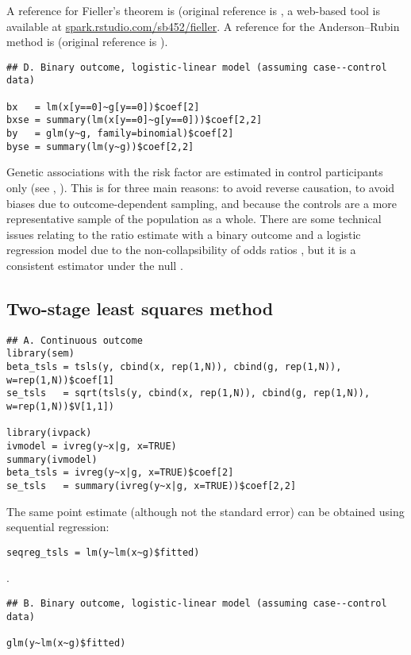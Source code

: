 \documentclass[a4paper,12pt]{article} %
\begin{document}
A reference for Fieller's theorem is \cite{buonaccorsi2005} (original reference is \cite{fieller1954}, a web-based tool is available at \url{spark.rstudio.com/sb452/fieller}. A reference for the Anderson--Rubin method is \cite{mikusheva2010} (original reference is \cite{anderson1949}).

\begin{lstlisting}
## D. Binary outcome, logistic-linear model (assuming case--control data)

bx   = lm(x[y==0]~g[y==0])$coef[2]
bxse = summary(lm(x[y==0]~g[y==0]))$coef[2,2]
by   = glm(y~g, family=binomial)$coef[2]
byse = summary(lm(y~g))$coef[2,2]
\end{lstlisting}

Genetic associations with the risk factor are estimated in control participants only (see \cite{didelez2007}, \cite{bowden2011}). This is for three main reasons: to avoid reverse causation, to avoid biases due to outcome-dependent sampling, and because the controls are a more representative sample of the population as a whole. There are some technical issues relating to the ratio estimate with a binary outcome and a logistic regression model due to the non-collapsibility of odds ratios \cite{greenland1999}, but it is a consistent estimator under the null \cite{burgess2012noncollapse, vansteelandt2010}.

\clearpage

\subsection{Two-stage least squares method}
\begin{lstlisting}
## A. Continuous outcome
library(sem)
beta_tsls = tsls(y, cbind(x, rep(1,N)), cbind(g, rep(1,N)), w=rep(1,N))$coef[1]
se_tsls   = sqrt(tsls(y, cbind(x, rep(1,N)), cbind(g, rep(1,N)), w=rep(1,N))$V[1,1])

library(ivpack)
ivmodel = ivreg(y~x|g, x=TRUE)
summary(ivmodel)
beta_tsls = ivreg(y~x|g, x=TRUE)$coef[2]
se_tsls   = summary(ivreg(y~x|g, x=TRUE))$coef[2,2]
\end{lstlisting}

The same point estimate (although not the standard error) can be obtained using sequential regression:

\begin{lstlisting}
seqreg_tsls = lm(y~lm(x~g)$fitted)
\end{lstlisting}.

\begin{lstlisting}
## B. Binary outcome, logistic-linear model (assuming case--control data)

glm(y~lm(x~g)$fitted)
\end{lstlisting}


\clearpage






\makeatletter
\renewcommand\@biblabel[1]{}
\makeatother


\end{document}
